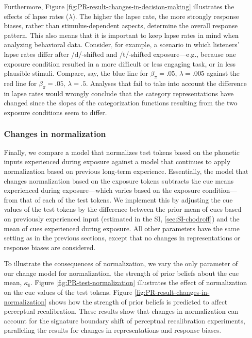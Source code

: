\documentclass[
  11pt,
  man,floatsintext]{apa6}
\begin{document}
Furthermore, Figure \ref{fig:PR-result-changes-in-decision-making} illustrates the effects of lapse rates (\(\lambda\)). The higher the lapse rate, the more strongly response biases, rather than stimulus-dependent aspects, determine the overall response pattern. This also means that it is important to keep lapse rates in mind when analyzing behavioral data. Consider, for example, a scenario in which listeners' lapse rates differ after /d/-shifted and /t/-shifted exposure---e.g., because one exposure condition resulted in a more difficult or less engaging task, or in less plausible stimuli. Compare, say, the blue line for \(\beta_{\pi} = .05\), \(\lambda = .005\) against the red line for \(\beta_{\pi} = .05\), \(\lambda = .5\). Analyses that fail to take into account the difference in lapse rates would wrongly conclude that the category representations have changed since the slopes of the categorization functions resulting from the two exposure conditions seem to differ.

\subsubsection{Changes in normalization}\label{changes-in-normalization}

Finally, we compare a model that normalizes test tokens based on the phonetic inputs experienced during exposure against a model that continues to apply normalization based on previous long-term experience. Essentially, the model that changes normalization based on the exposure tokens subtracts the cue means experienced during exposure---which varies based on the exposure condition---from that of each of the test tokens. We implement this by adjusting the cue values of the test tokens by the difference between the prior mean of cues based on previously experienced input (estimated in the SI, \ref{sec:SI-chodroff}) and the mean of cues experienced during exposure. All other parameters have the same setting as in the previous sections, except that no changes in representations or response biases are considered.

To illustrate the consequences of normalization, we vary the only parameter of our change model for normalization, the strength of prior beliefs about the cue mean, \(\kappa_0\). Figure \ref{fig:PR-test-normalization} illustrates the effect of normalization on the cue values of the test tokens. Figure \ref{fig:PR-result-changes-in-normalization} shows how the strength of prior beliefs is predicted to affect perceptual recalibration. These results show that changes in normalization can account for the signature boundary shift of perceptual recalibration experiments, paralleling the results for changes in representations and response biases.
\end{document}
